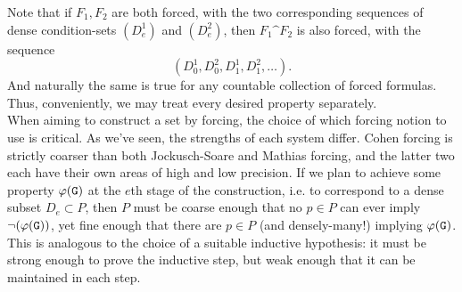 \documentclass{amsart}
\begin{document}
	
	Note that if $F_1,F_2$ are both forced, with the two corresponding sequences of dense condition-sets $(D^1_e)$ and $(D^2_e)$, then $F_1\^F_2$ is also forced, with the sequence
	$$
	(D^1_0,D^2_0,D^1_1,D^2_1,\dots).
	$$
	And naturally the same is true for any countable collection of forced formulas. Thus, conveniently, we may treat every desired property separately.\\
	
	
	When aiming to construct a set by forcing, the choice of which forcing notion to use is critical. As we've seen, the strengths of each system differ. Cohen forcing is strictly coarser than both Jockusch-Soare and Mathias forcing, and the latter two each have their own areas of high and low precision. If we plan to achieve some property $\varphi(\mathtt{G})$ at the $e$th stage of the construction, i.e. to correspond to a dense subset $D_e\subset P$, then $P$ must be coarse enough that no $p\in P$ can ever imply $\neg(\varphi(\mathtt{G}))$, yet fine enough that there are $p\in P$ (and densely-many!) implying $\varphi(\mathtt{G})$. This is analogous to the choice of a suitable inductive hypothesis: it must be strong enough to prove the inductive step, but weak enough that it can be maintained in each step.
	
\end{document}
